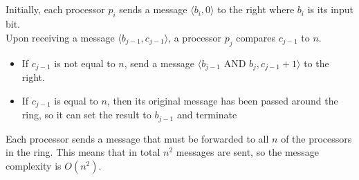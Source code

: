 \documentclass[11pt]{article}
\begin{document}
\subsection{}


%
%

%

Initially, each processor $p_i$ sends a message $\langle b_i, 0 \rangle$ to the right where $b_i$ is its input bit.\\
Upon receiving a message $\langle b_{j-1}, c_{j-1} \rangle$, a processor $p_j$ compares $c_{j-1}$ to $n$.
\begin{itemize}
\item If $c_{j-1}$ is not equal to $n$, send a message $\langle b_{j-1} \text{ AND } b_j, c_{j-1} + 1 \rangle$ to the right.
\item If $c_{j-1}$ is equal to $n$, then its original message has been passed around the ring, so it can set the result to $b_{j-1}$ and terminate
\end{itemize}
Each processor sends a message that must be forwarded to all $n$ of the processors in the ring. This means that in total $n^2$ messages are sent, so the message complexity is $O(n^2)$.
\end{document}
